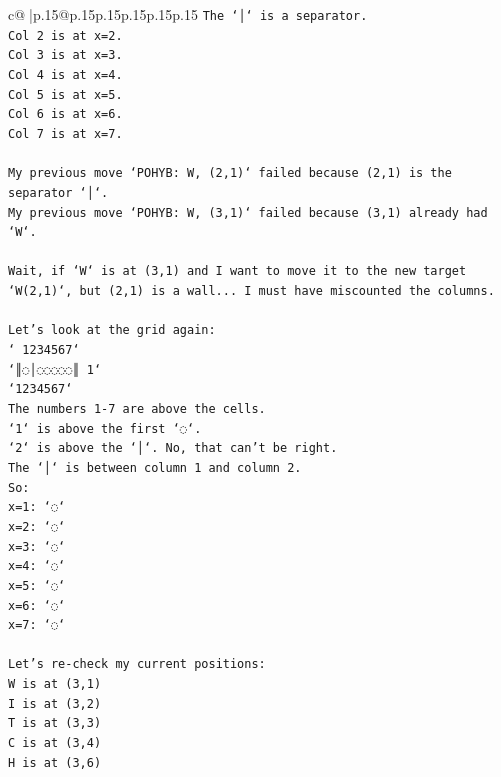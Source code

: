 \documentclass{article}
\begin{document}
{\begin{supertabular}{c@{$\;$}|p{.15\linewidth}@{}p{.15\linewidth}p{.15\linewidth}p{.15\linewidth}p{.15\linewidth}p{.15\linewidth}}
{{{\texttt{The `│` is a separator.} \\
\texttt{Col 2 is at x=2.} \\
\texttt{Col 3 is at x=3.} \\
\texttt{Col 4 is at x=4.} \\
\texttt{Col 5 is at x=5.} \\
\texttt{Col 6 is at x=6.} \\
\texttt{Col 7 is at x=7.} \\
\\ 
\texttt{My previous move `POHYB: W, (2,1)` failed because (2,1) is the separator `│`.} \\
\texttt{My previous move `POHYB: W, (3,1)` failed because (3,1) already had `W`.} \\
\\ 
\texttt{Wait, if `W` is at (3,1) and I want to move it to the new target `W(2,1)`, but (2,1) is a wall... I must have miscounted the columns.} \\
\\ 
\texttt{Let's look at the grid again:} \\
\texttt{` 1234567`} \\
\texttt{`║◌│◌◌◌◌◌║ 1`} \\
\texttt{`1234567`} \\
\texttt{The numbers 1{-}7 are above the cells.} \\
\texttt{`1` is above the first `◌`.} \\
\texttt{`2` is above the `│`. No, that can't be right.} \\
\texttt{The `│` is between column 1 and column 2.} \\
\texttt{So:} \\
\texttt{x=1: `◌`} \\
\texttt{x=2: `◌`} \\
\texttt{x=3: `◌`} \\
\texttt{x=4: `◌`} \\
\texttt{x=5: `◌`} \\
\texttt{x=6: `◌`} \\
\texttt{x=7: `◌`} \\
\\ 
\texttt{Let's re{-}check my current positions:} \\
\texttt{W is at (3,1)} \\
\texttt{I is at (3,2)} \\
\texttt{T is at (3,3)} \\
\texttt{C is at (3,4)} \\
\texttt{H is at (3,6)} \\
}}}
\end{supertabular}}
\end{document}
